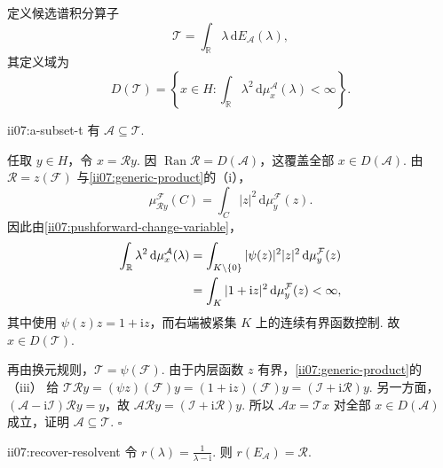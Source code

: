 定义候选谱积分算子
\[
\mathcal T
=
\int_{\mathbb R}\lambda\,\mathrm{d}E_{\mathcal A}(\lambda),
\]
其定义域为
\[
D(\mathcal T)
=
\left\{
 x\in H:
 \int_{\mathbb R}\lambda^2\,\mathrm{d}\mu_x^{\mathcal A}(\lambda)<\infty
\right\}.
\]

\begin{FAProposition}{ii07:a-subset-t}
有
\(\displaystyle \mathcal A\subseteq\mathcal T.\)
\end{FAProposition}

\begin{FAProof}
任取 \(\displaystyle y\in H\)，令 \(\displaystyle x=\mathcal Ry\). 因 \(\displaystyle\operatorname{Ran}\mathcal R=D(\mathcal A)\)，这覆盖全部 \(\displaystyle x\in D(\mathcal A)\). 由 \(\displaystyle\mathcal R=z(\mathcal F)\) 与\autoref{ii07:generic-product}的（i），
\[
\mu_{\mathcal Ry}^{\mathcal F}(C)
=
\int_C|z|^2\,\mathrm{d}\mu_y^{\mathcal F}(z).
\]
因此由\autoref{ii07:pushforward-change-variable}，
\[
\begin{aligned}
\displaystyle \int_{\mathbb R}\lambda^2\,\mathrm{d}\mu_x^{\mathcal A}(\lambda) &\displaystyle = \int_{K\setminus\{0\}}|\psi(z)|^2|z|^2\,\mathrm{d}\mu_y^{\mathcal F}(z)\\
\displaystyle &\displaystyle = \int_K|1+\mathrm{i}z|^2\,\mathrm{d}\mu_y^{\mathcal F}(z)<\infty,
\end{aligned}
\]
其中使用 \(\displaystyle\psi(z)z=1+\mathrm{i}z\)，而右端被紧集 \(\displaystyle K\) 上的连续有界函数控制. 故 \(\displaystyle x\in D(\mathcal T)\).

再由换元规则，\(\displaystyle\mathcal T=\psi(\mathcal F)\). 由于内层函数 \(\displaystyle z\) 有界，\autoref{ii07:generic-product}的（iii） 给
\(\displaystyle \mathcal T\mathcal Ry = (\psi z)(\mathcal F)y = (1+\mathrm{i}z)(\mathcal F)y = (\mathcal I+\mathrm{i}\mathcal R)y.\)
另一方面，\(\displaystyle(\mathcal A-\mathrm{i}\mathcal I)\mathcal Ry=y\)，故
\(\displaystyle \mathcal A\mathcal Ry=(\mathcal I+\mathrm{i}\mathcal R)y.\)
所以 \(\displaystyle\mathcal Ax=\mathcal Tx\) 对全部 \(\displaystyle x\in D(\mathcal A)\) 成立，证明 \(\displaystyle\mathcal A\subseteq\mathcal T\).
\hfill\(\square\)
\end{FAProof}

\begin{FAProposition}[B][从推送谱测度恢复预解]{ii07:recover-resolvent}
令
\(\displaystyle r(\lambda)=\frac1{\lambda-\mathrm{i}}.\)
则
\(\displaystyle r(E_{\mathcal A})=\mathcal R.\)
\end{FAProposition}

